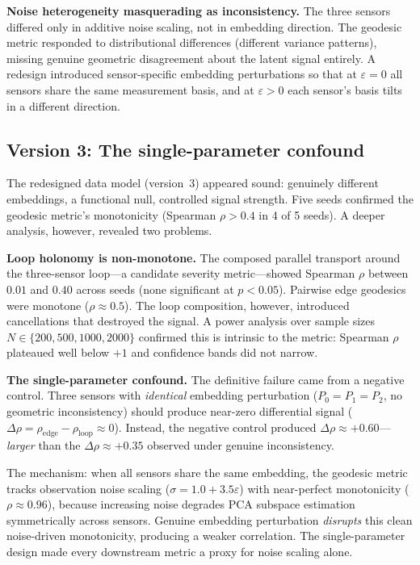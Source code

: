 \documentclass[11pt]{article}
\newcommand{\eps}{\varepsilon}
\begin{document}
\textbf{Noise heterogeneity masquerading as inconsistency.}  The
three sensors differed only in additive noise scaling, not in
embedding direction.  The geodesic metric responded to distributional
differences (different variance patterns), missing genuine geometric
disagreement about the latent signal entirely.  A redesign introduced
sensor-specific embedding perturbations so that at $\eps = 0$ all
sensors share the same measurement basis, and at $\eps > 0$ each
sensor's basis tilts in a different direction.

\subsection{Version 3: The single-parameter confound}
\label{sec:v3}

The redesigned data model (version~3) appeared sound: genuinely
different embeddings, a functional null, controlled signal
strength.  Five seeds confirmed the geodesic metric's monotonicity
(Spearman $\rho > 0.4$ in 4 of 5 seeds).  A deeper analysis,
however, revealed two problems.

\textbf{Loop holonomy is non-monotone.}  The composed parallel
transport around the three-sensor loop---a candidate severity
metric---showed Spearman $\rho$ between $0.01$ and $0.40$ across
seeds (none significant at $p < 0.05$).  Pairwise edge geodesics
were monotone ($\rho \approx 0.5$).  The loop composition,
however, introduced cancellations that destroyed the signal.  A power
analysis over sample sizes $N \in \{200, 500, 1000, 2000\}$
confirmed this is intrinsic to the metric: Spearman $\rho$ plateaued well below $+1$ and
confidence bands did not narrow.

\textbf{The single-parameter confound.}  The definitive failure
came from a negative control.  Three sensors with \emph{identical}
embedding perturbation ($P_0 = P_1 = P_2$, no geometric
inconsistency) should produce near-zero differential signal
($\Delta\rho = \rho_\mathrm{edge} - \rho_\mathrm{loop} \approx
0$).  Instead, the negative control produced $\Delta\rho \approx
+0.60$---\emph{larger} than the $\Delta\rho \approx +0.35$
observed under genuine inconsistency.

The mechanism: when all sensors share the same embedding, the
geodesic metric tracks observation noise scaling ($\sigma = 1.0 +
3.5\eps$) with near-perfect monotonicity ($\rho \approx 0.96$),
because increasing noise degrades PCA subspace estimation
symmetrically across sensors.  Genuine embedding perturbation
\emph{disrupts} this clean noise-driven monotonicity, producing a
weaker correlation.  The single-parameter design made
every downstream metric a proxy for noise scaling alone.
\end{document}
